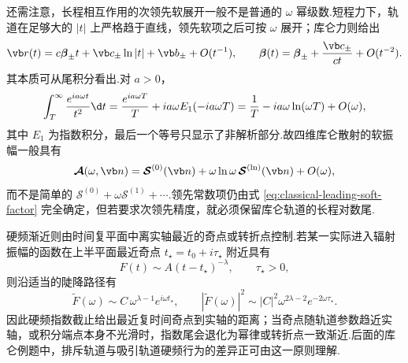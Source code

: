 还需注意，长程相互作用的次领先软展开一般不是普通的 $\omega$ 幂级数.短程力下，轨道在足够大的 $|t|$ 上严格趋于直线，领先软项之后可按 $\omega$ 展开；库仑力则给出
\begin{equation}
 \vb r(t)=c\boldsymbol\beta_\pm t+\vb c_\pm\ln|t|+\vb b_\pm+O(t^{-1}),
 \qquad
 \boldsymbol\beta(t)=\boldsymbol\beta_\pm+\frac{\vb c_\pm}{ct}+O(t^{-2}).
 \label{eq:coulomb-asymptotic-log-trajectory}
\end{equation}
其本质可从尾积分看出.对 $a>0$，
\begin{equation}
 \int_T^\infty\frac{e^{ia\omega t}}{t^2}\d t
 =\frac{e^{ia\omega T}}{T}+ia\omega E_1(-ia\omega T)
 =\frac{1}{T}-ia\omega\ln(\omega T)+O(\omega),
 \label{eq:coulomb-tail-soft-integral}
\end{equation}
其中 $E_1$ 为指数积分，最后一个等号只显示了非解析部分.故四维库仑散射的软振幅一般具有
\begin{equation}
 \boldsymbol{\mathcal A}(\omega,\vb n)
 =\boldsymbol{\mathcal S}^{(0)}(\vb n)
 +\omega\ln\omega\,\boldsymbol{\mathcal S}^{(\ln)}(\vb n)
 +O(\omega),
 \label{eq:coulomb-logarithmic-soft-expansion}
\end{equation}
而不是简单的 $\boldsymbol{\mathcal S}^{(0)}+\omega\boldsymbol{\mathcal S}^{(1)}+\cdots$.领先常数项仍由式 \eqref{eq:classical-leading-soft-factor} 完全确定，但若要求次领先精度，就必须保留库仑轨道的长程对数尾.


硬频渐近则由时间复平面中离实轴最近的奇点或转折点控制.若某一实际进入辐射振幅的函数在上半平面最近奇点 $t_\star=t_0+i\tau_\star$ 附近具有
\begin{equation}
 F(t)\sim A(t-t_\star)^{-\lambda},
 \qquad \tau_\star>0,
\end{equation}
则沿适当的陡降路径有
\begin{equation}
 \widetilde F(\omega)
 \sim C\,\omega^{\lambda-1}e^{i\omega t_\star},
 \qquad
 |\widetilde F(\omega)|^2
 \sim |C|^2\omega^{2\lambda-2}e^{-2\omega\tau_\star}.
 \label{eq:general-hard-frequency-asymptotic}
\end{equation}
因此硬频指数截止给出最近复时间奇点到实轴的距离；当奇点随轨道参数趋近实轴，或积分端点本身不光滑时，指数尾会退化为幂律或转折点一致渐近.后面的库仑例题中，排斥轨道与吸引轨道硬频行为的差异正可由这一原则理解.


